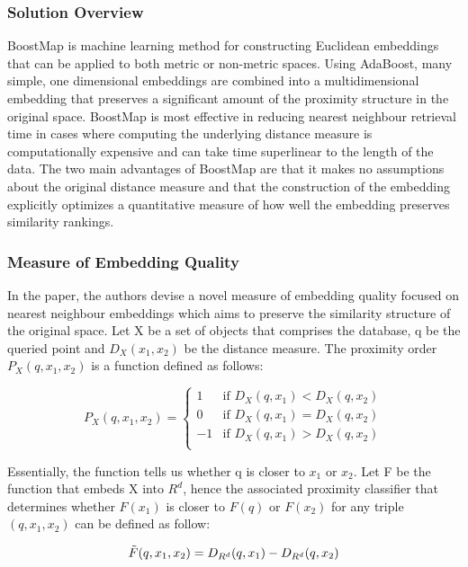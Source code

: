 \subsubsection{Solution Overview}
BoostMap is machine learning method for constructing Euclidean embeddings that can be applied to both metric or non-metric spaces. Using AdaBoost, many simple, one dimensional embeddings are combined into a multidimensional embedding that preserves a significant amount of the proximity structure in the original space. BoostMap is most effective in reducing nearest neighbour retrieval time in cases where computing the underlying distance measure is computationally expensive and can take time superlinear to the length of the data. The two main advantages of BoostMap are that it makes no assumptions about the original distance measure and that the construction of the embedding explicitly optimizes a quantitative measure of how well the embedding preserves similarity rankings.

\subsubsection{Measure of Embedding Quality}
In the paper, the authors devise a novel measure of embedding quality focused on nearest neighbour embeddings which aims to preserve the similarity structure of the original space. Let X be a set of objects that comprises the database, q be the queried point and $D_X(x_1,x_2)$ be the distance measure. The proximity order $P_X(q,x_1,x_2)$ is a function defined as follows:

\begin{equation}
 P_X(q,x_1,x_2) = \begin{cases} 1 &\mbox{if } D_X(q,x_1)< D_X(q,x_2)\\
0 &\mbox{if } D_X(q,x_1)= D_X(q,x_2)\\
-1 &\mbox{if } D_X(q,x_1)>D_X(q,x_2)\\\end{cases} 
\end{equation}

Essentially, the function tells us whether q is closer to $x_1$ or $x_2$. Let F be the function that embeds X into $R^d$, hence the associated proximity classifier that determines whether $F(x_1)$ is closer to $F(q)$ or $F(x_2)$ for any triple $(q,x_1,x_2)$ can be defined as follow:

\begin{equation}
    \Tilde{F}(q,x_1,x_2) = D_{R^d}(q,x_1) - D_{R^d}(q,x_2) 
\end{equation}

